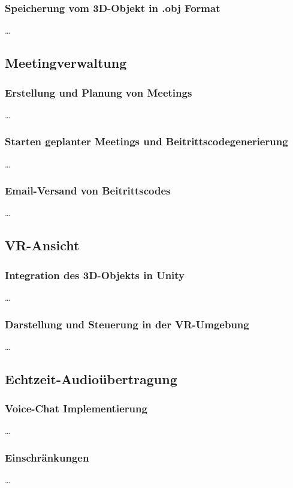 \subsubsection{Speicherung vom 3D-Objekt in .obj Format}
\ldots
\subsection{Meetingverwaltung}
\subsubsection{Erstellung und Planung von Meetings}
\ldots
\subsubsection{Starten geplanter Meetings und Beitrittscodegenerierung}
\ldots
\subsubsection{Email-Versand von Beitrittscodes}
\ldots
\subsection{VR-Ansicht}
\subsubsection{Integration des 3D-Objekts in Unity}
\ldots
\subsubsection{Darstellung und Steuerung in der VR-Umgebung}
\ldots
\subsection{Echtzeit-Audioübertragung}
\subsubsection{Voice-Chat Implementierung}
\ldots
\subsubsection{Einschränkungen}
\ldots